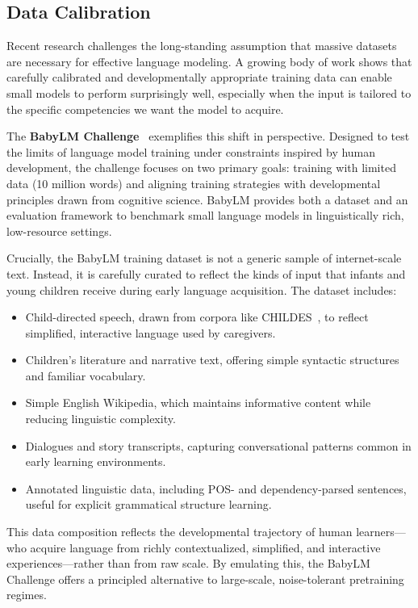 \subsection{Data Calibration}
Recent research challenges the long-standing assumption that massive datasets are necessary for effective language modeling. A growing body of work shows that carefully calibrated and developmentally appropriate training data can enable small models to perform surprisingly well, especially when the input is tailored to the specific competencies we want the model to acquire.

The \textbf{BabyLM Challenge}~\citep{warstadt2023babylm1, conll2024babylm2} exemplifies this shift in perspective. Designed to test the limits of language model training under constraints inspired by human development, the challenge focuses on two primary goals: training with limited data (10 million words) and aligning training strategies with developmental principles drawn from cognitive science. BabyLM provides both a dataset and an evaluation framework to benchmark small language models in linguistically rich, low-resource settings.

Crucially, the BabyLM training dataset is not a generic sample of internet-scale text. Instead, it is carefully curated to reflect the kinds of input that infants and young children receive during early language acquisition. The dataset includes:

\begin{itemize}
    \item Child-directed speech, drawn from corpora like CHILDES~\citep{macwhinney2000childes}, to reflect simplified, interactive language used by caregivers.
    \item Children's literature and narrative text, offering simple syntactic structures and familiar vocabulary.
    \item Simple English Wikipedia, which maintains informative content while reducing linguistic complexity.
    \item Dialogues and story transcripts, capturing conversational patterns common in early learning environments.
    \item Annotated linguistic data, including POS- and dependency-parsed sentences, useful for explicit grammatical structure learning.
\end{itemize}

This data composition reflects the developmental trajectory of human learners—who acquire language from richly contextualized, simplified, and interactive experiences—rather than from raw scale. By emulating this, the BabyLM Challenge offers a principled alternative to large-scale, noise-tolerant pretraining regimes.

